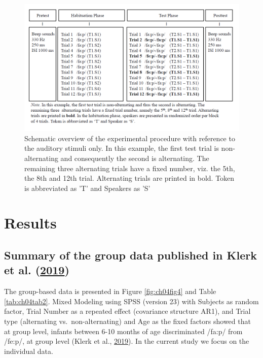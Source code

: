 \documentclass[openright,titlepage,12pt,a4paper]{book}
\begin{document}
\begin{figure}

{\centering \includegraphics[width=0.9\linewidth]{figures/chapter_4/Figure3} 

}

\caption{Schematic overview of the experimental procedure with reference to the auditory stimuli only. In this example, the first test trial is non-alternating and consequently the second is alternating. The remaining three alternating trials have a fixed number, viz. the 5th, the 8th and 12th trial. Alternating trials are printed in bold. Token is abbreviated as 'T' and Speakers as 'S'}\label{fig:ch04fig3}
\end{figure}

\hypertarget{results-3}{%
\section{Results}\label{results-3}}

\hypertarget{summary-of-the-group-data-published-in-de_klerk_lost_2019}{%
\subsection{\texorpdfstring{Summary of the group data published in Klerk et al. (\protect\hyperlink{ref-de_klerk_lost_2019}{2019})}{Summary of the group data published in Klerk et al. (2019)}}\label{summary-of-the-group-data-published-in-de_klerk_lost_2019}}

The group-based data is presented in Figure \ref{fig:ch04fig4} and Table \ref{tab:ch04tab2}. Mixed Modeling using SPSS (version 23) with Subjects as random factor, Trial Number as a repeated effect (covariance structure AR1), and Trial type (alternating vs.~non-alternating) and Age as the fixed factors showed that at group level, infants between 6-10 months of age discriminated /fa:p/ from /fe:p/, at group level (Klerk et al., \protect\hyperlink{ref-de_klerk_lost_2019}{2019}). In the current study we focus on the individual data.
\end{document}
